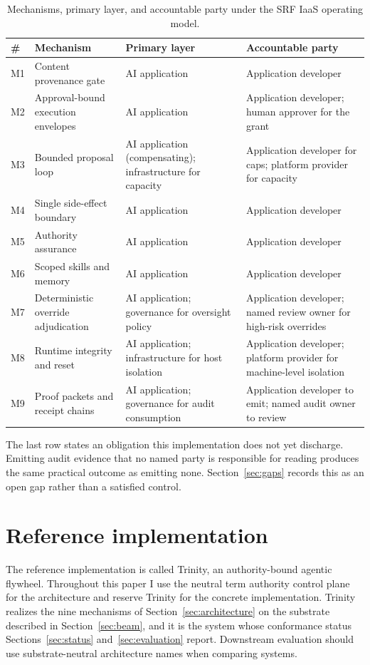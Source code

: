 \documentclass[11pt,letterpaper]{article}
\begin{document}
\begin{table}[htbp]
\centering
\small
\caption{Mechanisms, primary layer, and accountable party under the SRF IaaS operating model.}
\label{tab:accountability}
\begin{tabular}{@{}p{0.7cm}p{4.7cm}p{3.2cm}p{5.6cm}@{}}
\toprule
\textbf{\#} & \textbf{Mechanism} & \textbf{Primary layer} & \textbf{Accountable party} \\
\midrule
M1 & Content provenance gate & AI application & Application developer \\
M2 & Approval-bound execution envelopes & AI application & Application developer; human approver for the grant \\
M3 & Bounded proposal loop & AI application (compensating); infrastructure for capacity & Application developer for caps; platform provider for capacity \\
M4 & Single side-effect boundary & AI application & Application developer \\
M5 & Authority assurance & AI application & Application developer \\
M6 & Scoped skills and memory & AI application & Application developer \\
M7 & Deterministic override adjudication & AI application; governance for oversight policy & Application developer; named review owner for high-risk overrides \\
M8 & Runtime integrity and reset & AI application; infrastructure for host isolation & Application developer; platform provider for machine-level isolation \\
M9 & Proof packets and receipt chains & AI application; governance for audit consumption & Application developer to emit; named audit owner to review \\
\bottomrule
\end{tabular}
\end{table}

The last row states an obligation this implementation does not yet discharge. Emitting audit evidence that no named party is responsible for reading produces the same practical outcome as emitting none. Section~\ref{sec:gaps} records this as an open gap rather than a satisfied control.

\section{Reference implementation}\label{sec:refimpl}

The reference implementation is called Trinity, an authority-bound agentic flywheel. Throughout this paper I use the neutral term authority control plane for the architecture and reserve Trinity for the concrete implementation. Trinity realizes the nine mechanisms of Section~\ref{sec:architecture} on the substrate described in Section~\ref{sec:beam}, and it is the system whose conformance status Sections~\ref{sec:status} and~\ref{sec:evaluation} report. Downstream evaluation should use substrate-neutral architecture names when comparing systems.
\end{document}
